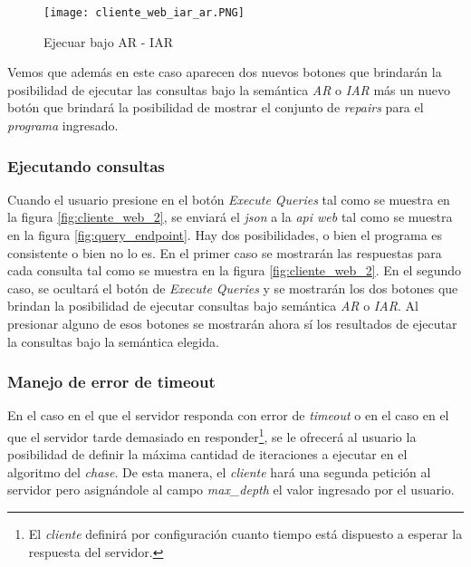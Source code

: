 \documentclass[11pt,a4paper,twoside]{tesis}
\begin{document}
\begin{figure}[ht]
    \texttt{[image: cliente\_web\_iar\_ar.PNG]}
    \centering
    \caption{Ejecuar bajo AR - IAR}
    \label{fig:cliente_web_iar_ar}
\end{figure}

Vemos que además en este caso aparecen dos nuevos botones que brindarán la posibilidad de ejecutar las consultas bajo la semántica \textit{AR} o \textit{IAR} más un nuevo botón que brindará la posibilidad de mostrar el conjunto de \textit{repairs} para el \textit{programa} ingresado.

\subsubsection{Ejecutando consultas}

Cuando el usuario presione en el botón \textit{Execute Queries} tal como se muestra en la figura \ref{fig:cliente_web_2}, se enviará el \textit{json} a la \textit{api web} tal como se muestra en la figura \ref{fig:query_endpoint}. Hay dos posibilidades, o bien el programa es consistente o bien no lo es. En el primer caso se mostrarán las respuestas para cada consulta tal como se muestra en la figura \ref{fig:cliente_web_2}. En el segundo caso, se ocultará el botón de \textit{Execute Queries} y se mostrarán los dos botones que brindan la posibilidad de ejecutar consultas bajo semántica \textit{AR} o \textit{IAR}. Al presionar alguno de esos botones se mostrarán ahora sí los resultados de ejecutar la consultas bajo la semántica elegida.

\subsubsection{Manejo de error de timeout}
En el caso en el que el servidor responda con error de \textit{timeout} o en el caso en el que el servidor tarde demasiado en responder\footnote{El \textit{cliente} definirá por configuración cuanto tiempo está dispuesto a esperar la respuesta del servidor.}, se le ofrecerá al usuario la posibilidad de definir la máxima cantidad de iteraciones a ejecutar en el algoritmo del \textit{chase}. De esta manera, el \textit{cliente} hará una segunda petición al servidor pero asignándole al campo \textit{max\_depth} el valor ingresado por el usuario.
\end{document}
